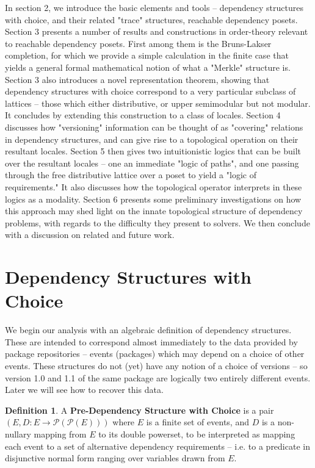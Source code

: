 \documentclass[hoptionsi,review,format=acmsmall]{acmart}
\theoremstyle{definition}
\newtheorem{definition}{Definition}[section]
\newcommand{\Pc}{\mathcal{P}}
\begin{document}
In section 2, we introduce the basic elements and tools -- dependency structures with choice, and their related "trace" structures, reachable dependency posets. Section 3 presents a number of results and constructions in order-theory relevant to reachable dependency posets. First among them is the Bruns-Lakser completion, for which we provide a simple calculation in the finite case that yields a general formal mathematical notion of what a "Merkle" structure is. Section 3 also introduces a novel representation theorem, showing that dependency structures with choice correspond to a very particular subclass of lattices -- those which either distributive, or upper semimodular but not modular. It concludes by extending this construction to a class of locales. Section 4 discusses how "versioning" information can be thought of as "covering" relations in dependency structures, and can give rise to a topological operation on their resultant locales. Section 5 then gives  two intuitionistic logics that can be built over the resultant locales  -- one an immediate "logic of paths", and one passing through the free distributive lattice over a poset to yield a "logic of requirements." It also discusses how the topological operator interprets in these logics as a modality. Section 6 presents some preliminary investigations on how this approach may shed light on the innate topological structure of dependency problems, with regards to the difficulty they present to solvers. We then conclude with a discussion on related and future work.

\section{Dependency Structures with Choice}
We begin our analysis with an algebraic definition of dependency structures. These are intended to correspond almost immediately to the data provided by package repositories -- events (packages) which may depend on a choice of other events. These structures do not (yet) have any notion of a choice of versions -- so version 1.0 and 1.1 of the same package are logically two entirely different events. Later we will see how to recover this data.

\begin{definition}
A \textbf{Pre-Dependency Structure with Choice} is a pair \((E, D : E \rightarrow \Pc(\Pc(E)))\) where \(E\) is a finite set of events, and \(D\) is a non-nullary mapping from \(E\) to its double powerset, to be interpreted as mapping each event to a set of alternative dependency requirements -- i.e. to a predicate in disjunctive normal form ranging over variables drawn from \(E\).
\end{definition}
\end{document}
